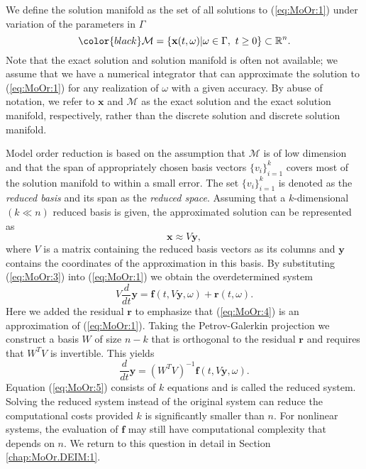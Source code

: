 \documentclass[final]{siamart}
\begin{document}
We define the solution manifold as the set of all solutions to (\ref{eq:MoOr:1}) under variation of {{\color{black}} the parameters in $\Gamma$}
\begin{equation} \label{eq:MoOr:2}
	{\color{black}} \mathcal M = \{ \mathbf x(t,\omega) | \omega \in \Gamma,\ t\geq 0 \} \subset \mathbb R^n.
\end{equation}
Note that the exact solution and solution manifold is {{\color{black}} often not} available; we assume that we have a numerical integrator that can approximate the solution to (\ref{eq:MoOr:1}) for any realization of $\omega$ {{\color{black}} with a given accuracy}. By abuse of notation, we refer to $\mathbf x$ and $\mathcal M$ as the exact solution and the exact solution manifold, respectively, rather than the discrete solution and discrete solution manifold. 

Model order reduction is based on the assumption that $\mathcal M$ is of low dimension \cite{Anonymous:2016wl,Antoulas:2005:ALD:1088857} and that the span of appropriately chosen basis vectors $\{v_i\}_{i=1}^k$ covers most of the solution manifold {{\color{black}} to within} a small error. The set $\{v_i\}_{i=1}^k$ is denoted as the \emph{reduced basis} and its span as the \emph{reduced space}. Assuming that a $k$-dimensional $(k\ll n)$ reduced basis is given, the approximated solution can be represented as
\begin{equation} \label{eq:MoOr:3}
	\mathbf x \approx V \mathbf y,
\end{equation}
where $V$ is a matrix containing the reduced basis vectors as its columns and $\mathbf y$ {{\color{black}} contains} the coordinates of the approximation in this basis. By substituting (\ref{eq:MoOr:3}) into (\ref{eq:MoOr:1}) we obtain the overdetermined system
\begin{equation} \label{eq:MoOr:4}
	V \frac{d}{dt} \mathbf y = \mathbf f (t , V \mathbf y , \omega) + \mathbf r(t,\omega).
\end{equation}
Here we added the residual $\mathbf r$ to emphasize that (\ref{eq:MoOr:4}) is an approximation of (\ref{eq:MoOr:1}). Taking the Petrov-Galerkin projection \cite{Antoulas:2005:ALD:1088857} we construct a basis $W$ of size $n-k$ that is orthogonal to the residual $\mathbf r$ and {{\color{black}} requires that} $W^T V$ is invertible. This yields
\begin{equation} \label{eq:MoOr:5}
	\frac{d}{dt} \mathbf y = (W^TV)^{-1} \mathbf f(t,V\mathbf y,\omega).
\end{equation}
Equation (\ref{eq:MoOr:5}) consists of $k$ equations and is called the reduced system. Solving the reduced system instead of the original system can reduce the computational costs {{\color{black}} provided} $k$ is significantly smaller than $n$. For nonlinear systems, the evaluation of $\mathbf f$ may still have computational complexity that depends on $n$. We return to this question in detail in Section \ref{chap:MoOr.DEIM:1}.
\end{document}
